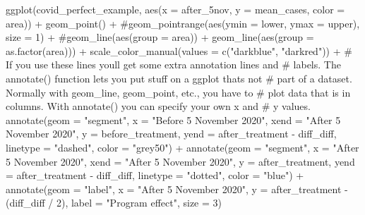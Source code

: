 \documentclass[
  letterpaper,
  DIV=11,
  numbers=noendperiod]{scrreprt}
\newenvironment{Shaded}{\begin{snugshade}}{\end{snugshade}}
\newcommand{\AttributeTok}[1]{\textcolor[rgb]{0.40,0.45,0.13}{#1}}
\newcommand{\CommentTok}[1]{\textcolor[rgb]{0.37,0.37,0.37}{#1}}
\newcommand{\DecValTok}[1]{\textcolor[rgb]{0.68,0.00,0.00}{#1}}
\newcommand{\FunctionTok}[1]{\textcolor[rgb]{0.28,0.35,0.67}{#1}}
\newcommand{\NormalTok}[1]{\textcolor[rgb]{0.00,0.23,0.31}{#1}}
\newcommand{\SpecialCharTok}[1]{\textcolor[rgb]{0.37,0.37,0.37}{#1}}
\newcommand{\StringTok}[1]{\textcolor[rgb]{0.13,0.47,0.30}{#1}}
\begin{document}
\begin{Shaded}
\begin{Highlighting}[]
\FunctionTok{ggplot}\NormalTok{(covid\_perfect\_example, }\FunctionTok{aes}\NormalTok{(}\AttributeTok{x =}\NormalTok{ after\_5nov, }\AttributeTok{y =}\NormalTok{ mean\_cases, }\AttributeTok{color =}\NormalTok{ area)) }\SpecialCharTok{+}
  \FunctionTok{geom\_point}\NormalTok{() }\SpecialCharTok{+}
  \CommentTok{\#geom\_pointrange(aes(ymin = lower, ymax = upper), size = 1) + }
  \CommentTok{\#geom\_line(aes(group = area)) +}
  \FunctionTok{geom\_line}\NormalTok{(}\FunctionTok{aes}\NormalTok{(}\AttributeTok{group =} \FunctionTok{as.factor}\NormalTok{(area))) }\SpecialCharTok{+}
  \FunctionTok{scale\_color\_manual}\NormalTok{(}\AttributeTok{values =} \FunctionTok{c}\NormalTok{(}\StringTok{"darkblue"}\NormalTok{, }\StringTok{"darkred"}\NormalTok{)) }\SpecialCharTok{+}
  \CommentTok{\# If you use these lines you\textquotesingle{}ll get some extra annotation lines and}
  \CommentTok{\# labels. The annotate() function lets you put stuff on a ggplot that\textquotesingle{}s not}
  \CommentTok{\# part of a dataset. Normally with geom\_line, geom\_point, etc., you have to}
  \CommentTok{\# plot data that is in columns. With annotate() you can specify your own x and}
  \CommentTok{\# y values.}
  \FunctionTok{annotate}\NormalTok{(}\AttributeTok{geom =} \StringTok{"segment"}\NormalTok{, }\AttributeTok{x =} \StringTok{"Before 5 November 2020"}\NormalTok{, }\AttributeTok{xend =} \StringTok{"After 5 November 2020"}\NormalTok{,}
           \AttributeTok{y =}\NormalTok{ before\_treatment, }\AttributeTok{yend =}\NormalTok{ after\_treatment }\SpecialCharTok{{-}}\NormalTok{ diff\_diff,}
           \AttributeTok{linetype =} \StringTok{"dashed"}\NormalTok{, }\AttributeTok{color =} \StringTok{"grey50"}\NormalTok{) }\SpecialCharTok{+}
  \FunctionTok{annotate}\NormalTok{(}\AttributeTok{geom =} \StringTok{"segment"}\NormalTok{, }\AttributeTok{x =} \StringTok{"After 5 November 2020"}\NormalTok{, }\AttributeTok{xend =} \StringTok{"After 5 November 2020"}\NormalTok{,}
           \AttributeTok{y =}\NormalTok{ after\_treatment, }\AttributeTok{yend =}\NormalTok{ after\_treatment }\SpecialCharTok{{-}}\NormalTok{ diff\_diff,}
           \AttributeTok{linetype =} \StringTok{"dotted"}\NormalTok{, }\AttributeTok{color =} \StringTok{"blue"}\NormalTok{) }\SpecialCharTok{+}
  \FunctionTok{annotate}\NormalTok{(}\AttributeTok{geom =} \StringTok{"label"}\NormalTok{, }\AttributeTok{x =} \StringTok{"After 5 November 2020"}\NormalTok{, }\AttributeTok{y =}\NormalTok{ after\_treatment }\SpecialCharTok{{-}}\NormalTok{ (diff\_diff }\SpecialCharTok{/} \DecValTok{2}\NormalTok{), }
           \AttributeTok{label =} \StringTok{"Program effect"}\NormalTok{, }\AttributeTok{size =} \DecValTok{3}\NormalTok{)}
\end{Highlighting}
\end{Shaded}
\end{document}
